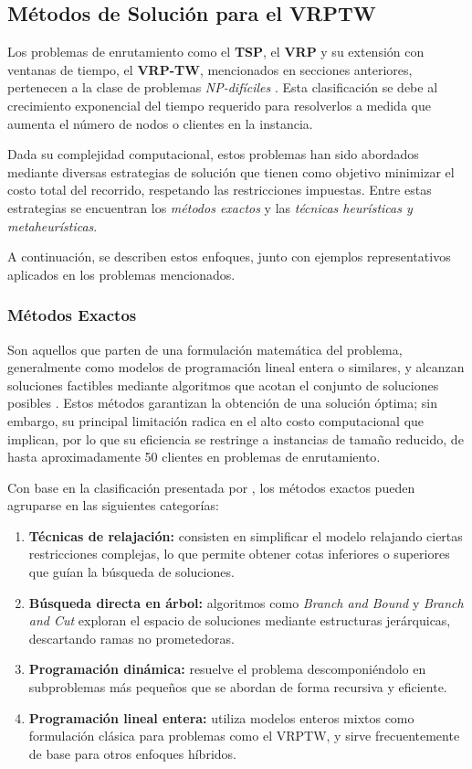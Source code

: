\documentclass[12pt,titlepage,twoside,openright]{book}
\begin{document}
\subsection{Métodos de Solución para el VRPTW}
Los problemas de enrutamiento como el \textbf{TSP}, el \textbf{VRP} y su extensión con ventanas de tiempo, el \textbf{VRP-TW}, mencionados en secciones anteriores, pertenecen a la clase de problemas \textit{NP-difíciles} \citep{papadimitriou1998, laporte1987, toth2014}. Esta clasificación se debe al crecimiento exponencial del tiempo requerido para resolverlos a medida que aumenta el número de nodos o clientes en la instancia.

Dada su complejidad computacional, estos problemas han sido abordados mediante diversas estrategias de solución que tienen como objetivo minimizar el costo total del recorrido, respetando las restricciones impuestas. Entre estas estrategias se encuentran los \textit{métodos exactos} y las \textit{técnicas heurísticas y metaheurísticas}. 

A continuación, se describen estos enfoques, junto con ejemplos representativos aplicados en los problemas mencionados.

\subsubsection{Métodos Exactos}

Son aquellos que parten de una formulación matemática del problema, generalmente como modelos de programación lineal entera o similares, y alcanzan soluciones factibles mediante algoritmos que acotan el conjunto de soluciones posibles \citep{luer2009}. Estos métodos garantizan la obtención de una solución óptima; sin embargo, su principal limitación radica en el alto costo computacional que implican, por lo que su eficiencia se restringe a instancias de tamaño reducido, de hasta aproximadamente 50 clientes en problemas de enrutamiento\citep{montes2017}.

Con base en la clasificación presentada por \citep{montes2017}, los métodos exactos pueden agruparse en las siguientes categorías:

\begin{enumerate}
    \item \textbf{Técnicas de relajación:} consisten en simplificar el modelo relajando ciertas restricciones complejas, lo que permite obtener cotas inferiores o superiores que guían la búsqueda de soluciones.
    \item \textbf{Búsqueda directa en árbol:} algoritmos como \emph{Branch and Bound} y \emph{Branch and Cut} exploran el espacio de soluciones mediante estructuras jerárquicas, descartando ramas no prometedoras.
    \item \textbf{Programación dinámica:} resuelve el problema descomponiéndolo en subproblemas más pequeños que se abordan de forma recursiva y eficiente.
    \item \textbf{Programación lineal entera:} utiliza modelos enteros mixtos como formulación clásica para problemas como el VRPTW, y sirve frecuentemente de base para otros enfoques híbridos.
\end{enumerate}
\end{document}

